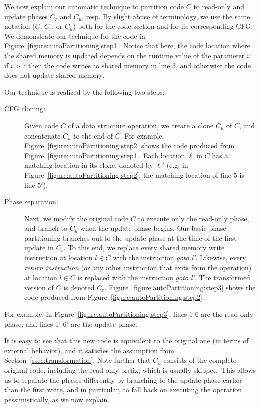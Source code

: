 We now explain our automatic technique to partition code $C$ to read-only and update phases $C_r$ and $C_u$, resp.
By slight abuse of terminology, we use the same notation ($C$, $C_r$, or $C_u$) both for the code section and
for its corresponding CFG.
%
We demonstrate our technique for the code in Figure~\ref{figure:autoPartitioning:step1}.
Notice that here, the code location where the shared memory is updated depends on the runtime value of the parameter $i$: if $i>7$ then the code writes to shared memory in line $3$, and otherwise the code does not update shared memory.

\noindent Our technique is realized by the following two steps:
\begin{description}
  \item [CFG cloning:]
Given code $C$ of a data structure operation, we create a clone $C_u$ of $C$, and concatenate $C_u$ to the end of $C$.
For example, Figure~\ref{figure:autoPartitioning:step2} shows the code produced from Figure~\ref{figure:autoPartitioning:step1}.
Each location $\ell$ in $C$ has a matching location in its clone, denoted by $\ell'$
(e.g, in Figure~\ref{figure:autoPartitioning:step2}, the matching location of line $5$ is line $5'$).
  \item [Phase separation:]
Next, we modify the original code $C$ to execute only the read-only phase, and branch to $C_u$ when the
update phase begins. Our basic phase partitioning branches out to the update phase at the time of the first update in $C_r$.
To this end, we replace every shared memory write instruction
at location $l \in C$ with the instruction \emph{goto l'}.
Likewise, every \emph{return instruction} (or any other instruction that exits from the operation)
at location $l \in C$ is replaced with the instruction \emph{goto l'}.
The transformed version of $C$ is denoted $C_r$.
Figure~\ref{figure:autoPartitioning:step3} shows the code produced from Figure~\ref{figure:autoPartitioning:step2}.
\end{description}


For example, in Figure~\ref{figure:autoPartitioning:step3}, lines 1-6 are the read-only phase; and lines 1'-6' are the update phase.

It is easy to see that this new code is equivalent to the original one (in terms of external behavior), and it satisfies the assumption from Section~\ref{ssec:transformation}. Note further that $C_u$ consists of the complete original code, including
the read-only prefix, which is usually skipped. This allows us to separate the phases differently by branching to 
the update phase earlier than the first write, and in particular, to fall back on executing the
operation pessimistically, as we now explain.

